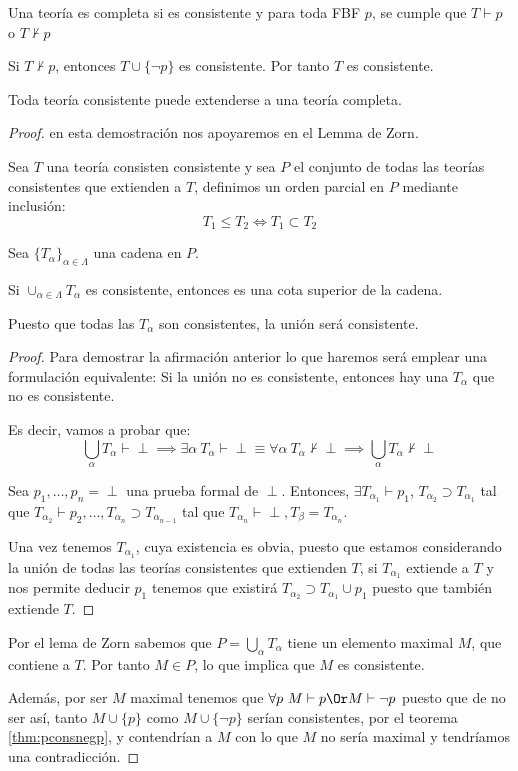 \documentclass{apuntes}
\begin{document}
\begin{defn}
Una teoría es completa si es consistente y para toda FBF $p$, se cumple que $T \vdash p$ o $T \nvdash p$
\end{defn}

\begin{theorem}
	Si $T \nvdash p$, entonces $T\cup \{\neg p\}$ es consistente. Por tanto $T$ es consistente.
	\label{thm:pconsnegp}
\end{theorem}

\begin{theorem}
	Toda teoría consistente puede extenderse a una teoría completa.
	\label{thm:lindenbaum}
\end{theorem}
\begin{proof}
	en esta demostración nos apoyaremos en el Lemma de Zorn. 

	Sea $T$ una teoría consisten consistente y sea $P$ el conjunto de todas las teorías consistentes que extienden a $T$, definimos un orden parcial en $P$ mediante inclusión:
	\[T_1\le T_2 \iff T_1\subset T_2\]

	Sea $\{T_\alpha\}_{\alpha\in\Lambda}$ una cadena en $P$.

	Si $\cup_{\alpha\in\Lambda} T_\alpha$ es consistente, entonces es una cota superior de la cadena. 

	Puesto que todas las $T_\alpha$ son consistentes, la unión será consistente.
	\begin{proof}
	Para demostrar la afirmación anterior lo que haremos será emplear una formulación equivalente: Si la unión no es consistente, entonces hay una $T_α$ que no es consistente.

	Es decir, vamos a probar que:
	\[\bigcup_α T_α \vdash \perp \implies \exists α \ T_α \vdash \perp \equiv \forall α \ T_α \nvdash \perp \implies \bigcup_αT_α \nvdash \perp\]

	Sea $p_1,\hdots,p_n = \perp$ una prueba formal de $\perp$. Entonces, $\exists T_{\alpha_1}\vdash p_1$, $T_{\alpha_2} \supset T_{\alpha_1}$ tal que $T_{\alpha_2}\vdash p_2, \hdots, T_{\alpha_n}\supset T_{\alpha_{n-1}}$ tal que $T_{\alpha_n}\vdash \perp, T_\beta = T_{\alpha_n}$.

	\obs Una vez tenemos $T_{α_1}$, cuya existencia es obvia, puesto que estamos considerando la unión de todas las teorías consistentes que extienden $T$, si $T_{α_1}$ extiende a $T$ y nos permite deducir $p_1$ tenemos que existirá $T_{α_2} \supset T_{α_1} \cup p_1$ puesto que también extiende $T$.
	\end{proof}

	Por el lema de Zorn sabemos que $P=\bigcup_αT_α$ tiene un elemento maximal $M$, que contiene a $T$. Por tanto $M\in P$, lo que implica que $M$ es consistente.

	Además, por ser $M$ maximal tenemos que $\forall p \ M \vdash p \Or M \vdash \neg p$ puesto que de no ser así, tanto $M\cup\{p\}$ como $M\cup\{\neg p\}$ serían consistentes, por el teorema \ref{thm:pconsnegp}, y contendrían a $M$ con lo que $M$ no sería maximal y tendríamos una contradicción.
\end{proof}
\end{document}
